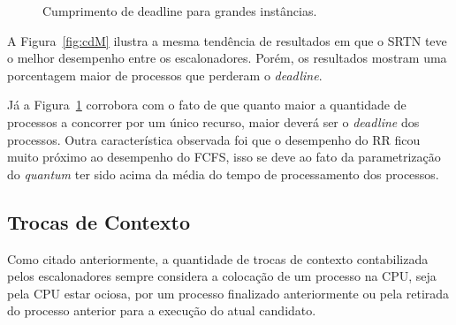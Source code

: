 \documentclass[12pt]{article}
\begin{document}
\begin{figure}
	\centering
	\hfill
	\caption{Cumprimento de deadline para grandes instâncias.}
	\label{fig:cdL}
\end{figure}

A Figura~\ref{fig:cdM} ilustra a mesma tendência de resultados em que o SRTN teve o melhor desempenho entre os escalonadores. Porém, os resultados mostram uma porcentagem maior de processos que perderam o \textit{deadline}.

Já a Figura~\ref{fig:cdL} corrobora com o fato de que quanto maior a quantidade de processos a concorrer por um único recurso, maior deverá ser o \textit{deadline} dos processos. Outra característica observada foi que o desempenho do RR ficou muito próximo ao desempenho do FCFS, isso se deve ao fato da parametrização do \textit{quantum} ter sido acima da média do tempo de processamento dos processos.

\subsection{Trocas de Contexto}

Como citado anteriormente, a quantidade de trocas de contexto contabilizada pelos escalonadores sempre considera a colocação de um processo na CPU, seja pela CPU estar ociosa, por um processo finalizado anteriormente ou pela retirada do processo anterior para a execução do atual candidato.
\end{document}
